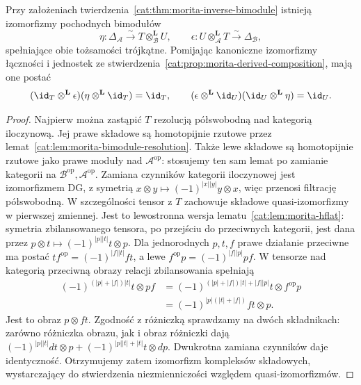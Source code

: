 \begin{stwierdzenie}\label{cat:prop:morita-inverse-coherence}
Przy założeniach twierdzenia~\ref{cat:thm:morita-inverse-bimodule} istnieją izomorfizmy pochodnych bimodułów
\[
 \eta:\Delta_{\mathcal A}\xrightarrow{\sim}T\otimes_{\mathcal B}^{\mathbf L}U,
 \qquad
 \epsilon:U\otimes_{\mathcal A}^{\mathbf L}T\xrightarrow{\sim}\Delta_{\mathcal B},
\]
spełniające obie tożsamości trójkątne. Pomijając kanoniczne izomorfizmy łączności i jednostek ze stwierdzenia~\ref{cat:prop:morita-derived-composition}, mają one postać
\[
 (\id_T\otimes^{\mathbf L}\epsilon)(\eta\otimes^{\mathbf L}\id_T)=\id_T,
 \qquad
 (\epsilon\otimes^{\mathbf L}\id_U)(\id_U\otimes^{\mathbf L}\eta)=\id_U.
\]
\end{stwierdzenie}
\begin{proof}
Najpierw można zastąpić $T$ rezolucją półswobodną nad kategorią iloczynową. Jej prawe składowe są homotopijnie rzutowe przez lemat~\ref{cat:lem:morita-bimodule-resolution}. Także lewe składowe są homotopijnie rzutowe jako prawe moduły nad $\mathcal A^{\mathrm{op}}$: stosujemy ten sam lemat po zamianie kategorii na $\mathcal B^{\mathrm{op}},\mathcal A^{\mathrm{op}}$. Zamiana czynników kategorii iloczynowej jest izomorfizmem DG, z symetrią $x\otimes y\mapsto(-1)^{|x||y|}y\otimes x$, więc przenosi filtrację półswobodną. W szczególności tensor z $T$ zachowuje składowe quasi-izomorfizmy w pierwszej zmiennej. Jest to lewostronna wersja lematu~\ref{cat:lem:morita-hflat}: symetria zbilansowanego tensora, po przejściu do przeciwnych kategorii, jest dana przez $p\otimes t\mapsto(-1)^{|p||t|}t\otimes p$. Dla jednorodnych $p,t,f$ prawe działanie przeciwne ma postać $t f^{\mathrm{op}}=(-1)^{|f||t|}ft$, a lewe $f^{\mathrm{op}}p=(-1)^{|f||p|}pf$. W tensorze nad kategorią przeciwną obrazy relacji zbilansowania spełniają
\[
 \begin{aligned}
 (-1)^{(|p|+|f|)|t|}t\otimes pf
 &=(-1)^{(|p|+|f|)|t|+|f||p|}t\otimes f^{\mathrm{op}}p\\
 &=(-1)^{|p|(|t|+|f|)}ft\otimes p.
 \end{aligned}
\]
Jest to obraz $p\otimes ft$. Zgodność z różniczką sprawdzamy na dwóch składnikach: zarówno różniczka obrazu, jak i obraz różniczki dają $(-1)^{|p||t|}dt\otimes p+(-1)^{|p||t|+|t|}t\otimes dp$. Dwukrotna zamiana czynników daje identyczność. Otrzymujemy zatem izomorfizm kompleksów składowych, wystarczający do stwierdzenia niezmienniczości względem quasi-izomorfizmów.


\end{proof}
